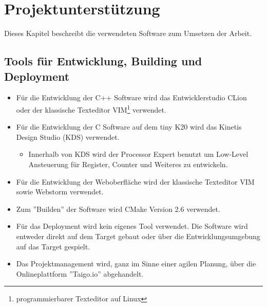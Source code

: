\section{Projektunterstützung}
Dieses Kapitel beschreibt die verwendeten Software zum Umsetzen der Arbeit.

\subsection{Tools für Entwicklung, Building und Deployment}
\begin{itemize}
    \item Für die Entwicklung der C++ Software wird das Entwicklerstudio CLion oder der klassische Texteditor VIM\footnote{programmierbarer Texteditor auf Linux} verwendet.
    \item Für die Entwicklung der C Software auf dem tiny K20 wird das Kinetis Design Studio (KDS) verwendet.
    \begin{itemize}
        \item Innerhalb von KDS wird der Processor Expert benutzt um Low-Level Ansteuerung für Register, Counter und Weiteres zu entwickeln.
    \end{itemize}
    \item Für die Entwicklung der Weboberfläche wird der klassische Texteditor VIM sowie Webstorm verwendet.
    \item Zum ''Builden'' der Software wird CMake Version 2.6 verwendet.
    \item Für das Deployment wird kein eigenes Tool verwendet. Die Software wird entweder direkt auf dem Target gebaut oder über die Entwicklungsumgebung auf das Target gespielt.
    \item Das Projektmanagement wird, ganz im Sinne einer agilen Planung, über die Onlineplattform ''Taigo.io'' abgehandelt.
\end{itemize}